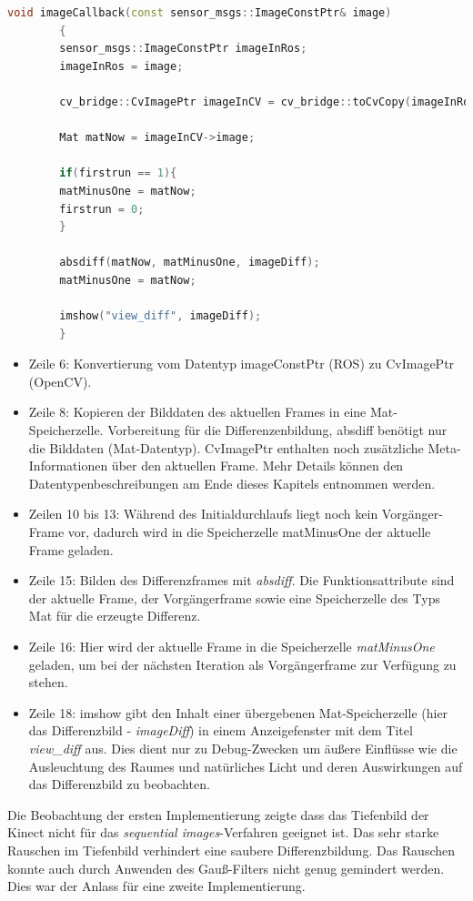 		\begin{lstlisting}[caption=imageCallback Funktion des Objekt-Erkennungs nodes, label=imageCallback-V1, title=imageCallback-V1, language=C++]
		void imageCallback(const sensor_msgs::ImageConstPtr& image)
		{
		sensor_msgs::ImageConstPtr imageInRos;
		imageInRos = image;
		
		cv_bridge::CvImagePtr imageInCV = cv_bridge::toCvCopy(imageInRos);
		
		Mat matNow = imageInCV->image;
		
		if(firstrun == 1){
		matMinusOne = matNow;
		firstrun = 0;
		}
		
		absdiff(matNow, matMinusOne, imageDiff);
		matMinusOne = matNow;
				
		imshow("view_diff", imageDiff);
		}
		\end{lstlisting}
		\begin{itemize}
		\item Zeile 6: Konvertierung vom Datentyp imageConstPtr (ROS) zu CvImagePtr (OpenCV).
		\item Zeile 8: Kopieren der Bilddaten des aktuellen Frames in eine Mat-Speicherzelle. Vorbereitung für die Differenzenbildung, absdiff benötigt nur die Bilddaten (Mat-Datentyp). CvImagePtr enthalten noch zusätzliche Meta-Informationen über den aktuellen Frame. Mehr Details können den Datentypenbeschreibungen am Ende dieses Kapitels entnommen werden.
		\item Zeilen 10 bis 13: Während des Initialdurchlaufs liegt noch kein Vorgänger-Frame vor, dadurch wird in die Speicherzelle matMinusOne der aktuelle Frame geladen.
		\item Zeile 15: Bilden des Differenzframes mit \textit{absdiff}. Die Funktionsattribute sind der aktuelle Frame, der Vorgängerframe sowie eine Speicherzelle des Typs Mat für die erzeugte Differenz.
		\item Zeile 16: Hier wird der aktuelle Frame in die Speicherzelle \textit{matMinusOne} geladen, um bei der nächsten Iteration als Vorgängerframe zur Verfügung zu stehen.
		\item Zeile 18: imshow gibt den Inhalt einer übergebenen Mat-Speicherzelle (hier das Differenzbild - \textit{imageDiff}) in einem Anzeigefenster mit dem Titel \textit{view\_diff} aus. Dies dient nur zu Debug-Zwecken um äußere Einflüsse wie die Ausleuchtung des Raumes und natürliches Licht und deren Auswirkungen auf das Differenzbild zu beobachten.
		\end{itemize}
		
		Die Beobachtung der ersten Implementierung zeigte dass das Tiefenbild der Kinect nicht für das \textit{sequential images}-Verfahren geeignet ist. Das sehr starke Rauschen im Tiefenbild verhindert eine saubere Differenzbildung. Das Rauschen konnte auch durch Anwenden des Gauß-Filters nicht genug gemindert werden. Dies war der Anlass für eine zweite Implementierung.
		
